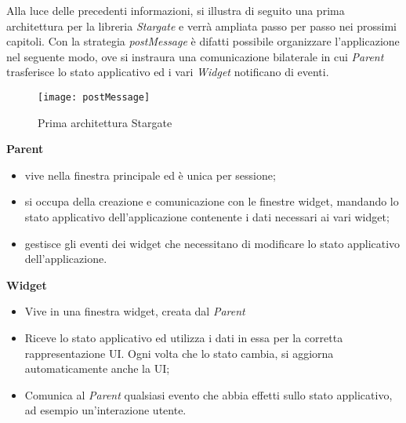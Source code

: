 Alla luce delle precedenti informazioni, si illustra di seguito una prima architettura per la libreria \textit{Stargate} e verrà ampliata passo per passo nei prossimi capitoli. Con la strategia \textit{postMessage} è difatti possibile organizzare l'applicazione nel seguente modo, ove si instraura una comunicazione bilaterale in cui \textit{Parent} trasferisce lo stato applicativo ed i vari \textit{Widget} notificano di eventi. \\

\begin{figure}[H] 
  \centering 
  \texttt{[image: postMessage]} 
  \caption{Prima architettura Stargate}
\end{figure}

\textbf{Parent}
    \begin{itemize}
        \item vive nella finestra principale ed è unica per sessione;
        \item si occupa della creazione e comunicazione con le finestre widget, mandando lo stato applicativo dell'applicazione contenente i dati necessari ai vari widget;
        \item gestisce gli eventi dei widget che necessitano di modificare lo stato applicativo dell'applicazione.
    \end{itemize}
\textbf{Widget}
    \begin{itemize}
        \item Vive in una finestra widget, creata dal \textit{Parent}
        \item Riceve lo stato applicativo ed utilizza i dati in essa per la corretta rappresentazione UI. Ogni volta che lo stato cambia, si aggiorna automaticamente anche la UI;
        \item Comunica al \textit{Parent} qualsiasi evento che abbia effetti sullo stato applicativo, ad esempio un'interazione utente.
    \end{itemize}
